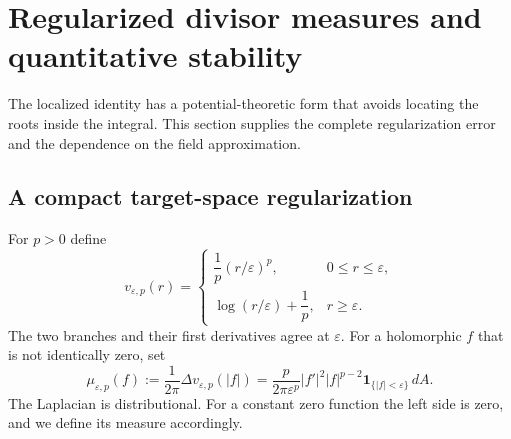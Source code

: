 \section{Regularized divisor measures and quantitative stability}
\label{reg:section}

The localized identity has a potential-theoretic form that avoids locating
the roots inside the integral. This section supplies the complete
regularization error and the dependence on the field approximation.

\subsection{A compact target-space regularization}
For $p>0$ define
\begin{equation}\label{reg:potential}
 v_{\varepsilon,p}(r)=
 \begin{cases}
  \dfrac1p(r/\varepsilon)^p,&0\le r\le\varepsilon,\\[3pt]
  \log(r/\varepsilon)+\dfrac1p,&r\ge\varepsilon.
 \end{cases}
\end{equation}
The two branches and their first derivatives agree at $\varepsilon$.
For a holomorphic $f$ that is not identically zero, set
\begin{equation}\label{reg:measure}
 \mu_{\varepsilon,p}(f)
 :=\frac1{2\pi}\Delta v_{\varepsilon,p}(|f|)
 =\frac{p}{2\pi\varepsilon^p}
       |f'|^2|f|^{p-2}\mathbf1_{\{|f|<\varepsilon\}}\,dA.
\end{equation}
The Laplacian is distributional. For a constant zero function the left
side is zero, and we define its measure accordingly.

